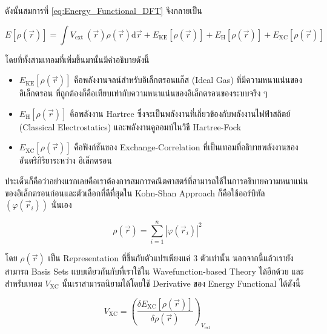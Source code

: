 \noindent ดังนั้นสมการที่ \eqref{eq:Energy_Functional_DFT} จึงกลายเป็น

\begin{equation}
    E[\rho(\vec{r})]
    =
    \int V_{\text{ext }}(\vec{r}) \rho(\vec{r}) \mathrm{d} \vec{r}
    + E_{\text{KE}}[\rho(\vec{r})]
    + E_{\text{H}}[\rho(\vec{r})]
    + E_{\text{XC}}[\rho(\vec{r})]
\end{equation}

\noindent โดยที่ทั้งสามเทอมที่เพิ่มขึ้นมานั้นมีคำอธิบายดังนี้

\begin{itemize}[topsep=0pt,noitemsep]
    \setlength\itemsep{1em}
    \item $E_{\text{KE}}[\rho(\vec{r})]$ คือพลังงานจลน์สำหรับอิเล็กตรอนแก๊ส (Ideal Gas) ที่มีความหนาแน่นของอิเล็กตรอน%
          ที่ถูกต้องก็คือเทียบเท่ากับความหนาแน่นของอิเล็กตรอนของระบบจริง ๆ

    \item $E_{\text{H}}[\rho(\vec{r})]$ คือพลังงาน Hartree ซึ่งจะเป็นพลังงานที่เกี่ยวข้องกับพลังงานไฟฟ้าสถิตย์ (Classical
          Electrostatics) และพลังงานคูลอมบ์ในวิธี Hartree-Fock

    \item $E_{\text{XC}}[\rho(\vec{r})]$ คือฟังก์ชันของ Exchange-Correlation ที่เป็นเทอมที่อธิบายพลังงานของอันตริกิริยาระหว่าง%
          อิเล็กตรอน
\end{itemize}

ประเด็นก็คือว่าอย่างแรกเลยคือเราต้องการสมการคณิตศาสตร์ที่สามารถใช้ในการอธิบายความหนาแน่นของอิเล็กตรอนก่อนและตัวเลือกที่ดีที่สุดใน Kohn-Shan
Approach ก็คือใช้ออร์บิทัล $(\varphi\left(\vec{r}_i\right))$ นั่นเอง

\begin{equation}
    \label{eq:Electron_Density}
    \rho(\vec{r})
    =
    \sum_{i=1}^n
    \left|
    \varphi\left(\vec{r}_i\right)
    \right|^2
\end{equation}

\noindent โดย $\rho(\vec{r})$ เป็น Representation ที่ขึ้นกับตัวแปรเพียงแค่ 3 ตัวเท่านั้น นอกจากนี้แล้วเรายังสามารถ Basis Sets
แบบเดียวกันกับที่เราใช้ใน Wavefunction-based Theory ได้อีกด้วย และสำหรับเทอม $V_{\mathrm{XC}}$ นั้นเราสามารถนิยามได้โดยใช้
Derivative ของ Energy Functional ได้ดังนี้

\begin{equation}
    V_{\mathrm{XC}}
    =
    \left(
    \frac
    {
        \delta E_{\mathrm{XC}}[\rho(\vec{r})]
    }
    {
        \delta \rho(\vec{r})
    }
    \right)_{V_{\mathrm{ext}}}
\end{equation}

